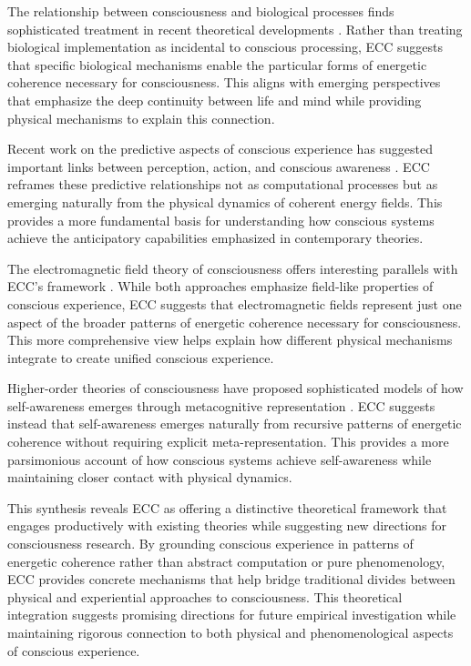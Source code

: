 \begin{refsection}
The relationship between consciousness and biological processes finds sophisticated treatment in recent theoretical developments \cite{Thompson2018}. Rather than treating biological implementation as incidental to conscious processing, ECC suggests that specific biological mechanisms enable the particular forms of energetic coherence necessary for consciousness. This aligns with emerging perspectives that emphasize the deep continuity between life and mind while providing physical mechanisms to explain this connection.

Recent work on the predictive aspects of conscious experience has suggested important links between perception, action, and conscious awareness \cite{Seth2021}. ECC reframes these predictive relationships not as computational processes but as emerging naturally from the physical dynamics of coherent energy fields. This provides a more fundamental basis for understanding how conscious systems achieve the anticipatory capabilities emphasized in contemporary theories.

The electromagnetic field theory of consciousness offers interesting parallels with ECC's framework \cite{McFadden2020}. While both approaches emphasize field-like properties of conscious experience, ECC suggests that electromagnetic fields represent just one aspect of the broader patterns of energetic coherence necessary for consciousness. This more comprehensive view helps explain how different physical mechanisms integrate to create unified conscious experience.

Higher-order theories of consciousness have proposed sophisticated models of how self-awareness emerges through metacognitive representation \cite{Rosenthal2019}. ECC suggests instead that self-awareness emerges naturally from recursive patterns of energetic coherence without requiring explicit meta-representation. This provides a more parsimonious account of how conscious systems achieve self-awareness while maintaining closer contact with physical dynamics.

This synthesis reveals ECC as offering a distinctive theoretical framework that engages productively with existing theories while suggesting new directions for consciousness research. By grounding conscious experience in patterns of energetic coherence rather than abstract computation or pure phenomenology, ECC provides concrete mechanisms that help bridge traditional divides between physical and experiential approaches to consciousness. This theoretical integration suggests promising directions for future empirical investigation while maintaining rigorous connection to both physical and phenomenological aspects of conscious experience.
     

\end{refsection}
